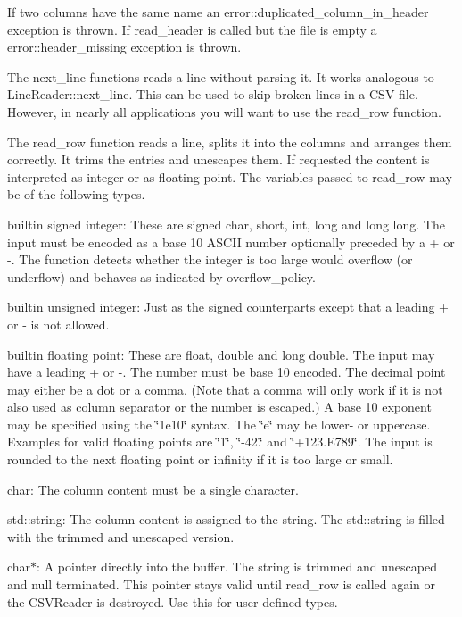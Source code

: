 If two columns have the same name an error\+::duplicated\+\_\+column\+\_\+in\+\_\+header exception is thrown. If {\ttfamily read\+\_\+header} is called but the file is empty a {\ttfamily error\+::header\+\_\+missing} exception is thrown.

The {\ttfamily next\+\_\+line} functions reads a line without parsing it. It works analogous to {\ttfamily Line\+Reader\+::next\+\_\+line}. This can be used to skip broken lines in a C\+SV file. However, in nearly all applications you will want to use the {\ttfamily read\+\_\+row} function.

The {\ttfamily read\+\_\+row} function reads a line, splits it into the columns and arranges them correctly. It trims the entries and unescapes them. If requested the content is interpreted as integer or as floating point. The variables passed to read\+\_\+row may be of the following types.


\begin{DoxyItemize}
\item builtin signed integer\+: These are {\ttfamily signed char}, {\ttfamily short}, {\ttfamily int}, {\ttfamily long} and {\ttfamily long long}. The input must be encoded as a base 10 A\+S\+C\+II number optionally preceded by a + or -\/. The function detects whether the integer is too large would overflow (or underflow) and behaves as indicated by overflow\+\_\+policy.
\item builtin unsigned integer\+: Just as the signed counterparts except that a leading + or -\/ is not allowed.
\item builtin floating point\+: These are {\ttfamily float}, {\ttfamily double} and {\ttfamily long double}. The input may have a leading + or -\/. The number must be base 10 encoded. The decimal point may either be a dot or a comma. (Note that a comma will only work if it is not also used as column separator or the number is escaped.) A base 10 exponent may be specified using the \char`\"{}1e10\char`\"{} syntax. The \char`\"{}e\char`\"{} may be lower-\/ or uppercase. Examples for valid floating points are \char`\"{}1\char`\"{}, \char`\"{}-\/42.\char`\"{} and \char`\"{}+123.\+E789\char`\"{}. The input is rounded to the next floating point or infinity if it is too large or small.
\item {\ttfamily char}\+: The column content must be a single character.
\item {\ttfamily std\+::string}\+: The column content is assigned to the string. The std\+::string is filled with the trimmed and unescaped version.
\item {\ttfamily char$\ast$}\+: A pointer directly into the buffer. The string is trimmed and unescaped and null terminated. This pointer stays valid until read\+\_\+row is called again or the C\+S\+V\+Reader is destroyed. Use this for user defined types.
\end{DoxyItemize}

